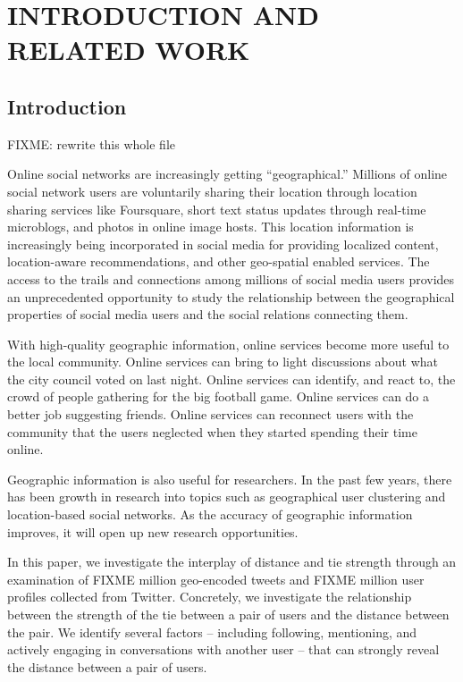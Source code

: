 \ifdefined\THESIS
    \pagestyle{plain} %
    \setcounter{page}{1}
    \chapter{\uppercase {Introduction and Related Work}}
\else
\fi

\section{Introduction}

FIXME: rewrite this whole file


Online social networks are increasingly getting ``geographical.'' Millions of
online
social network users are voluntarily sharing their location through location
sharing
services like Foursquare, short text status updates
through real-time microblogs, and photos in online image hosts. This location
information is increasingly being
incorporated in social media for providing localized content, location-aware
recommendations, and other geo-spatial enabled services. The access to the
trails and connections among millions of social media users provides an
unprecedented opportunity to study the relationship between the geographical
properties of social media users and the social relations connecting them.

With high-quality geographic information, online services become more useful to
the local community.  Online services can bring to light discussions about what
the city council voted on last night.  Online services can identify, and react
to, the crowd of people gathering for the big football game.  Online services
can do a better job suggesting friends.  Online services can reconnect users
with the community that the users neglected when they started spending their
time online.

Geographic information is also useful for researchers.  In the past few years,
there has been growth in research into topics such as geographical user
clustering and location-based social networks.  As the accuracy of geographic
information improves, it will open up new research opportunities.

In this paper, we investigate the interplay of distance and tie strength
through an examination of FIXME million geo-encoded tweets and FIXME million user
profiles collected from Twitter. Concretely, we investigate the relationship
between the strength of the tie between a pair of users and the distance
between the pair.  We identify several factors -- including following,
mentioning, and actively engaging in conversations with another user -- that
can strongly reveal the distance between a pair of users.

